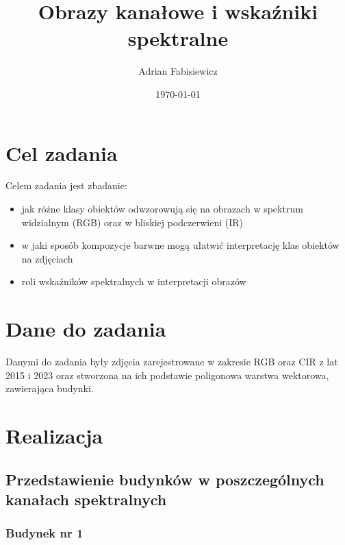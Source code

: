 \documentclass[a4paper,12pt]{article}  %
\title{Obrazy kanałowe i wskaźniki spektralne}
\author{Adrian Fabisiewicz}
\date{\today}
\begin{document}
\maketitle  %

\section{Cel zadania}
Celem zadania jest zbadanie:
\begin{itemize}
    \item jak różne klasy obiektów odwzorowują się na obrazach w spektrum widzialnym (RGB) oraz w bliskiej podczerwieni (IR) 
    \item w jaki sposób kompozycje barwne mogą ułatwić interpretację klas obiektów na zdjęciach
    \item roli wskaźników spektralnych w interpretacji obrazów
\end{itemize}

\section{Dane do zadania}
Danymi do zadania były zdjęcia zarejestrowane w zakresie RGB oraz CIR z lat 2015 i 2023 oraz stworzona na ich podstawie poligonowa warstwa wektorowa, zawierająca budynki.

\section{Realizacja}
\subsection{Przedstawienie budynków w poszczególnych kanałach spektralnych}

\subsubsection{Budynek nr 1}

\end{document}
